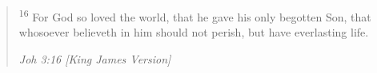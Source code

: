 \begin{quote}
\textsuperscript{16} For God so loved the world, that he gave his only begotten Son, that whosoever believeth in him should not perish, but have everlasting life.
\begin{flushright}
\emph{Joh 3:16 [King James Version]}
\end{flushright}
\end{quote}
